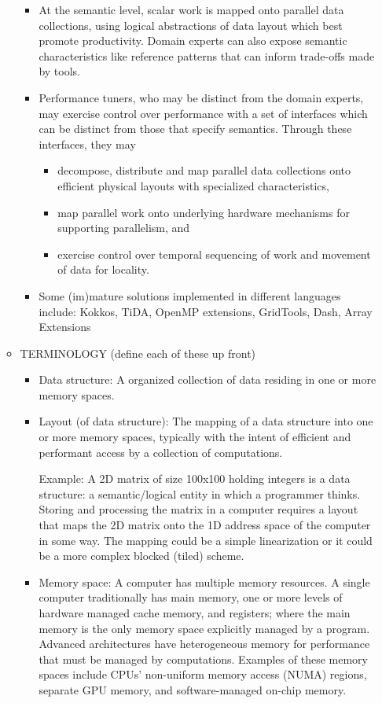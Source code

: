 \begin{itemize}
\begin{itemize}
\begin{itemize}
  \item At the semantic level, scalar work is mapped onto parallel data collections, using logical abstractions of data layout which best promote productivity.  Domain experts can also expose semantic characteristics like reference patterns that can inform trade-offs made by tools.
  \item Performance tuners, who may be distinct from the domain experts, may exercise control over performance with a set of interfaces which can be distinct from those that specify semantics.  Through these interfaces, they may 
    \begin{itemize}
    \item decompose, distribute and map parallel data collections onto efficient physical layouts with specialized characteristics, 
    \item map parallel work onto underlying hardware mechanisms for supporting parallelism, and 
    \item exercise control over temporal sequencing of work and movement of data for locality.
    \end{itemize}
  \item Some (im)mature solutions implemented in different languages include: Kokkos, TiDA, OpenMP extensions, GridTools, Dash, Array Extensions
\end{itemize}


\item TERMINOLOGY (define each of these up front)
  \begin{itemize}

 \item Data structure: A organized collection of data residing in one or more memory spaces. 

  \item Layout (of data structure):
    The mapping of a data structure into one or more memory spaces, typically with the intent of efficient and performant access by a collection of computations.

    Example: A 2D matrix of size 100x100 holding integers is a data structure: a semantic/logical entity in which a programmer thinks. Storing and processing the matrix in a computer requires a layout that maps the 2D matrix onto the 1D address space of the computer in some way. The mapping could be a simple linearization or it could be a more complex blocked (tiled) scheme.

  \item Memory space: A computer has multiple memory resources.  A single computer traditionally has main memory, one or more levels of hardware managed cache memory, and registers; where the main memory is the only memory space explicitly managed by a program.  Advanced architectures have heterogeneous memory for performance that must be managed by computations.  Examples of these memory spaces include CPUs' non-uniform memory access (NUMA) regions, separate GPU memory, and software-managed on-chip memory.


\end{itemize}
\end{itemize}
\end{itemize}
